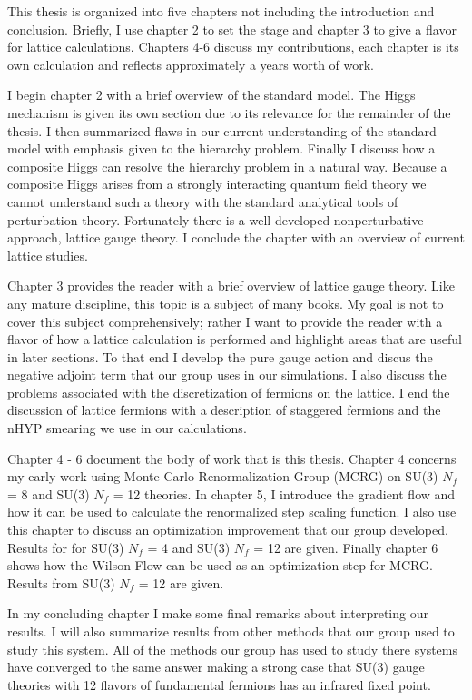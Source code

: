 This thesis is organized into five chapters not including the introduction and conclusion.
Briefly, I use chapter 2 to set the stage and chapter 3 to give a flavor for lattice calculations.
Chapters 4-6 discuss my contributions, each chapter is its own calculation and reflects approximately a years worth of work.

I begin chapter 2 with a brief overview of the standard model.
The Higgs mechanism is given its own section due to its relevance for the remainder of the thesis.
I then summarized flaws in our current understanding of the standard model with emphasis given to the hierarchy problem.
Finally I discuss how a composite Higgs can resolve the hierarchy problem in a natural way.
Because a composite Higgs arises from a strongly interacting quantum field theory we cannot understand such a theory with the standard analytical tools of perturbation theory.
Fortunately there is a well developed nonperturbative approach, lattice gauge theory.
I conclude the chapter with an overview of current lattice studies.

Chapter 3 provides the reader with a brief overview of lattice gauge theory.
Like any mature discipline, this topic is a subject of many books.
My goal is not to cover this subject comprehensively; rather I want to provide the reader with a flavor of how a lattice calculation is performed and highlight areas that are useful in later sections.
To that end I develop the pure gauge action and discus the negative adjoint term that our group uses in our simulations.
I also discuss the problems associated with the discretization of fermions on the lattice.
I end the discussion of lattice fermions with a description of staggered fermions and the nHYP smearing we use in our calculations.

Chapter 4 - 6 document the body of work that is this thesis.
Chapter 4 concerns my early work using Monte Carlo Renormalization Group (MCRG) on SU(3) $N_f$ = 8 and SU(3) $N_f$ = 12 theories.
In chapter 5, I introduce the gradient flow and how it can be used to calculate the renormalized step scaling function.
I also use this chapter to discuss an optimization improvement that our group developed.
Results for for SU(3) $N_f$ = 4 and SU(3) $N_f$ = 12 are given.
Finally chapter 6 shows how the Wilson Flow can be used as an optimization step for MCRG.
Results from SU(3) $N_f$ = 12 are given.

In my concluding chapter I make some final remarks about interpreting our results.
I will also summarize results from other methods that our group used to study this system.
All of the methods our group has used to study there systems have converged to the same answer making a strong case that SU(3) gauge theories with 12 flavors of fundamental fermions has an infrared fixed point.
